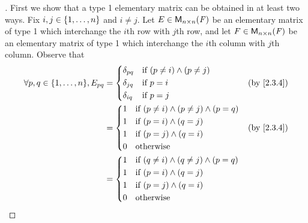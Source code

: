 \begin{proof}[]
	First we show that a type 1 elementary matrix can be obtained in at least two ways.
	Fix \(i, j \in \left\lbrace1, \dots, n\right\rbrace\) and \(i \neq j\).
	Let \(E \in \ms[n][n][\F]\) be an elementary matrix of type 1 which interchange the \(i\)th row with \(j\)th row, and let \(F \in \ms[n][n][\F]\) be an elementary matrix of type 1 which interchange the \(i\)th column with \(j\)th column.
	Observe that
	\begin{align*}
		\forall p, q \in \set{1, \dots, n}, E_{p q} & = \begin{dcases}
			                                                \delta_{p q} & \text{if } (p \neq i) \land (p \neq j) \\
			                                                \delta_{j q} & \text{if } p = i                       \\
			                                                \delta_{i q} & \text{if } p = j
		                                                \end{dcases}    &  & \by{2.3.4}    \\
		                                            & = \begin{dcases}
			                                                1 & \text{if } (p \neq i) \land (p \neq j) \land (p = q) \\
			                                                1 & \text{if } (p = i) \land (q = j)                     \\
			                                                1 & \text{if } (p = j) \land (q = i)                     \\
			                                                0 & \text{otherwise}
		                                                \end{dcases} &  & \by{2.3.4} \\
		                                            & = \begin{dcases}
			                                                1 & \text{if } (q \neq i) \land (q \neq j) \land (p = q) \\
			                                                1 & \text{if } (p = i) \land (q = j)                     \\
			                                                1 & \text{if } (p = j) \land (q = i)                     \\
			                                                0 & \text{otherwise}
		                                                \end{dcases} \\

\end{align*}
\end{proof}
